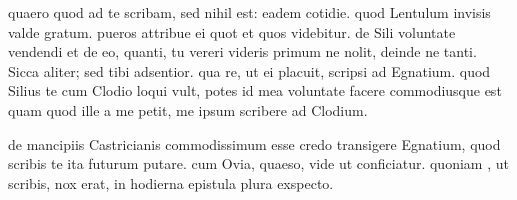 


 quaero quod ad te scribam, sed nihil est: eadem cotidie. quod Lentulum invisis valde gratum. pueros attribue ei quot et quos videbitur. de Sili voluntate vendendi et de eo, quanti, tu vereri videris primum ne nolit, deinde ne tanti. Sicca aliter; sed tibi adsentior. qua re, ut ei placuit, scripsi ad Egnatium. quod Silius te cum Clodio loqui vult, potes id mea voluntate facere commodiusque est quam quod ille a me petit, me ipsum scribere ad Clodium.

 de mancipiis Castricianis commodissimum esse credo transigere Egnatium, quod scribis te ita futurum putare. cum Ovia, quaeso, vide ut conficiatur. quoniam , ut scribis, nox erat, in hodierna epistula plura exspecto.
